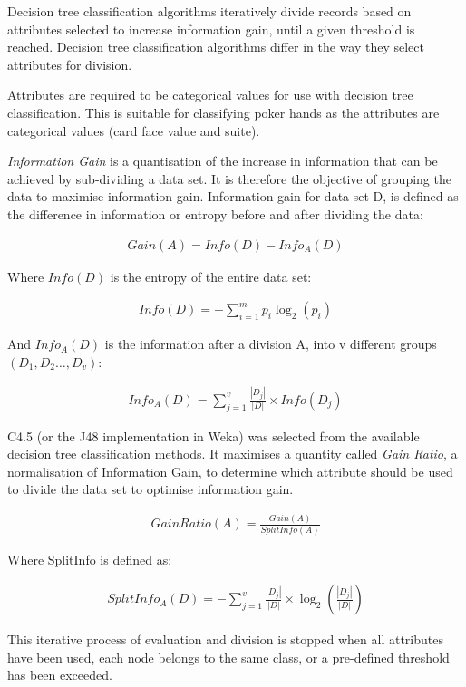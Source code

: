 \documentclass[11pt, a4paper]{article}
\begin{document}
Decision tree classification algorithms iteratively divide records based on attributes selected to increase information gain, until a given threshold is reached. Decision tree classification algorithms differ in the way they select attributes for division.

Attributes are required to be categorical values for use with decision tree classification. This is suitable for classifying poker hands as the attributes are categorical values (card face value and suite).

\textit{Information Gain} is a quantisation of the increase in information that can be achieved by sub-dividing a data set. It is therefore the objective of grouping the data to maximise information gain. Information gain for data set D, is defined as the difference in information or entropy before and after dividing the data:

\begin{align*}
	Gain(A) = Info(D) - Info_A(D)
\end{align*}

Where $Info(D)$ is the entropy of the entire data set:

\begin{align*}
	Info(D) = - \sum^{m}_{i=1}p_i\log_2(p_i)
\end{align*}

And $Info_A(D)$ is the information after a division A, into v different groups $(D_1,  D_2 \ldots, D_v)$:

\begin{align*}
	Info_A(D) = \sum^{v}_{j=1}\frac{|D_j|}{|D|} \times Info(D_j)
\end{align*}


C4.5 (or the J48 implementation in Weka) was selected from the available decision tree classification methods. It maximises a quantity called \textit{Gain Ratio}, a normalisation of Information Gain, to determine which attribute should be used to divide the data set to optimise information gain.

\begin{align*}
	Gain Ratio(A) = \frac{Gain(A)}{SplitInfo(A)}
\end{align*}

Where SplitInfo is defined as:

\begin{align*}
	SplitInfo_A(D) = - \sum^{v}_{j=1}\frac{|D_j|}{|D|} \times \log_2(\frac{|D_j|}{|D|})
\end{align*}

This iterative process of evaluation and division is stopped when all attributes have been used, each node belongs to the same class, or a pre-defined threshold has been exceeded.
\end{document}

